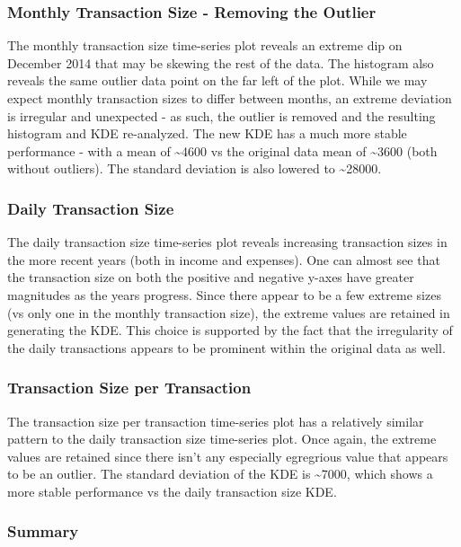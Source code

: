 \documentclass[11pt]{article}
\begin{document}
\subsubsection{Monthly Transaction Size - Removing the Outlier}

The monthly transaction size time-series plot reveals an extreme dip on
December 2014 that may be skewing the rest of the data. The histogram
also reveals the same outlier data point on the far left of the plot.
While we may expect monthly transaction sizes to differ between months,
an extreme deviation is irregular and unexpected - as such, the outlier
is removed and the resulting histogram and KDE re-analyzed. The new KDE
has a much more stable performance - with a mean of
\textasciitilde{}4600 vs the original data mean of \textasciitilde{}3600
(both without outliers). The standard deviation is also lowered to
\textasciitilde{}28000.

\subsubsection{Daily Transaction Size}

The daily transaction size time-series plot reveals increasing
transaction sizes in the more recent years (both in income and
expenses). One can almost see that the transaction size on both the
positive and negative y-axes have greater magnitudes as the years
progress. Since there appear to be a few extreme sizes (vs only one in
the monthly transaction size), the extreme values are retained in
generating the KDE. This choice is supported by the fact that the
irregularity of the daily transactions appears to be prominent within
the original data as well.

\subsubsection{Transaction Size per Transaction}

The transaction size per transaction time-series plot has a relatively
similar pattern to the daily transaction size time-series plot. Once
again, the extreme values are retained since there isn't any especially
egregrious value that appears to be an outlier. The standard deviation
of the KDE is \textasciitilde{}7000, which shows a more stable
performance vs the daily transaction size KDE.

\subsubsection{Summary}
\end{document}
